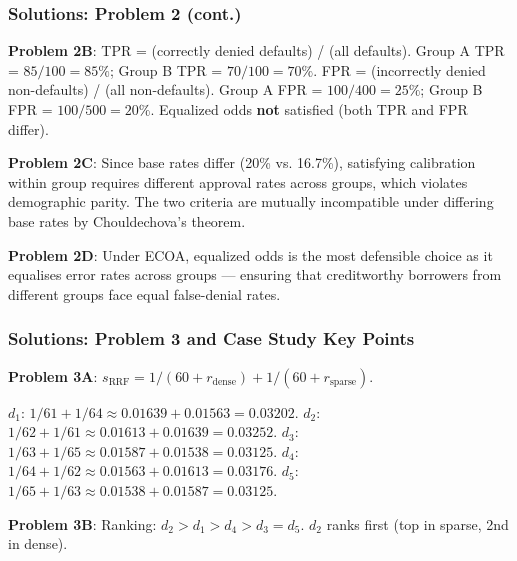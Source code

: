 \documentclass[9pt,t]{beamer}
\begin{document}
\begin{frame}
\frametitle{Solutions: Problem 2 (cont.)}

\textbf{Problem 2B}: TPR = (correctly denied defaults) / (all defaults). Group A TPR = $85/100 = 85\%$; Group B TPR = $70/100 = 70\%$. FPR = (incorrectly denied non-defaults) / (all non-defaults). Group A FPR = $100/400 = 25\%$; Group B FPR = $100/500 = 20\%$. Equalized odds \textbf{not} satisfied (both TPR and FPR differ).

\medskip
\textbf{Problem 2C}: Since base rates differ (20\% vs. 16.7\%), satisfying calibration within group requires different approval rates across groups, which violates demographic parity. The two criteria are mutually incompatible under differing base rates by Chouldechova's theorem.

\medskip
\textbf{Problem 2D}: Under ECOA, equalized odds is the most defensible choice as it equalises error rates across groups — ensuring that creditworthy borrowers from different groups face equal false-denial rates.
\end{frame}

\begin{frame}
\frametitle{Solutions: Problem 3 and Case Study Key Points}

\textbf{Problem 3A}: $s_{\text{RRF}} = 1/(60 + r_{\text{dense}}) + 1/(60 + r_{\text{sparse}})$.

$d_1$: $1/61 + 1/64 \approx 0.01639 + 0.01563 = 0.03202$. $d_2$: $1/62 + 1/61 \approx 0.01613 + 0.01639 = 0.03252$. $d_3$: $1/63 + 1/65 \approx 0.01587 + 0.01538 = 0.03125$. $d_4$: $1/64 + 1/62 \approx 0.01563 + 0.01613 = 0.03176$. $d_5$: $1/65 + 1/63 \approx 0.01538 + 0.01587 = 0.03125$.

\textbf{Problem 3B}: Ranking: $d_2 > d_1 > d_4 > d_3 = d_5$. $d_2$ ranks first (top in sparse, 2nd in dense).
\end{frame}
\end{document}
